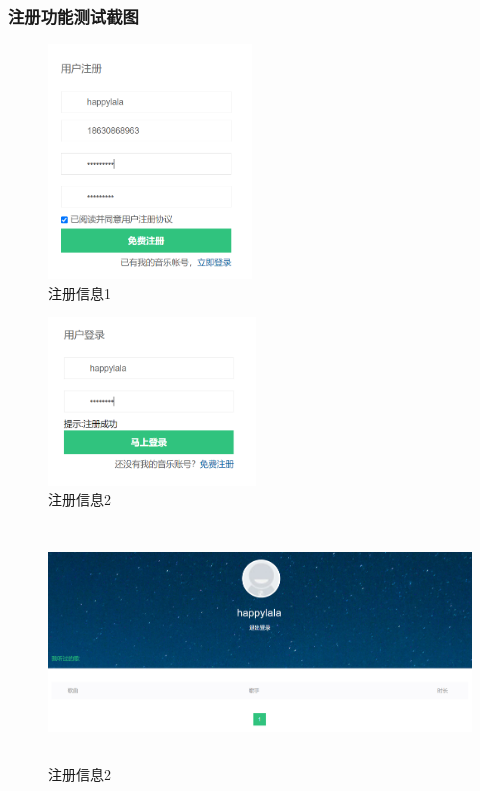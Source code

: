 \documentclass[UTF8,14pt]{article}
\numberwithin{figure}{subsubsection}
\numberwithin{table}{subsubsection}
\begin{document}
\subsubsection{注册功能测试截图}
\begin{minipage}[t]{0.5\linewidth}
	\begin{figure}[H]
		\includegraphics[width=5.39cm,height=6.21cm]{register1.png}
		\caption{注册信息1}
	\end{figure}
\end{minipage}
\hfill
\begin{minipage}[t]{0.5\linewidth}
	\begin{figure}[H]
		\centering
		\includegraphics[width=5.51cm,height=4.46cm]{register2.png}
		\caption{注册信息2}
	\end{figure}
\end{minipage}
\begin{figure}[H]
	\centering
	\includegraphics[width=14.664cm,height=6.256cm]{register3.png}
	\caption{注册信息2}
\end{figure}
\end{document}
